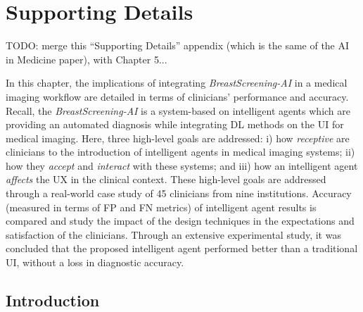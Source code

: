 \chapter{Supporting Details}
\label{chap:app002}

TODO: merge this ``Supporting Details'' appendix (which is the same of the AI in Medicine paper), with Chapter 5...

In this chapter, the implications of integrating {\it BreastScreening-AI} in a medical imaging workflow are detailed in terms of clinicians' performance and accuracy.
Recall, the {\it BreastScreening-AI} is a system-based on intelligent agents which are providing an automated diagnosis while integrating \ac{DL} methods on the \ac{UI} for medical imaging.
Here, three high-level goals are addressed:
i) how {\it receptive} are clinicians to the introduction of intelligent agents in medical imaging systems;
ii) how they {\it accept} and {\it interact} with these systems; and
iii) how an intelligent agent {\it affects} the \ac{UX} in the clinical context.
These high-level goals are addressed through a real-world case study of 45 clinicians from nine institutions.
Accuracy (measured in terms of \ac{FP} and \ac{FN} metrics) of intelligent agent results is compared and study the impact of the design techniques in the expectations and satisfaction of the clinicians.
Through an extensive experimental study, it was concluded that the proposed intelligent agent performed better than a traditional \ac{UI}, without a loss in diagnostic accuracy.

\section{Introduction}
\label{sec:app002001}

